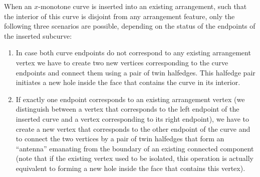 When an $x$-monotone curve is inserted into an existing arrangement, such
that the interior of this curve is disjoint from any arrangement feature,
only the following three scenarios are possible, depending on the status
of the endpoints of the inserted subcurve:
\begin{enumerate}
%
\item In case both curve endpoints do not correspond to any existing
arrangement vertex we have to create two new vertices
corresponding to the curve endpoints and connect them using a pair
of twin halfedges. This halfedge pair initiates a new hole inside
the face that contains the curve in its interior.
%
\item If exactly one endpoint corresponds to an existing arrangement
vertex (we distinguish between a vertex that corresponds to the left
endpoint of the inserted curve and a vertex corresponding to its right
endpoint), we have to create a new vertex that corresponds to the other
endpoint of the curve and to connect the two vertices by a pair of
twin halfedges that form an ``antenna'' emanating from the boundary
of an existing connected component (note that if the existing vertex
used to be isolated, this operation is actually equivalent to forming
a new hole inside the face that contains this vertex).


\end{enumerate}
